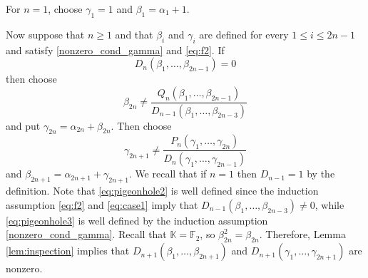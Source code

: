 \documentclass[a4paper,12pt]{article}
\def\bbf{\mathbb{F}}
\def\fq{\bbk}
\def\bbk{\mathbb{K}}
\newcommand{\HankelPolynomial}{D}
\newcommand {\ignore}[1]  {}
\begin{document}
For $n=1$, choose $\gamma_1=1$ and $\beta_1=\alpha_1+1$. 
\ignore{For $n=2$, if $\beta_1=0$ then choose $\beta_2=1$ and $\gamma_2=\alpha_2+1$, and then choose $\beta_3=\alpha_2+\alpha_3$ and $\gamma_3=\alpha_2$. Otherwise, if $\beta_1=1$ then choose $\beta_2$ arbitrary and $\gamma_2=\alpha_2+\beta_2$, and then choose $\beta_3=\gamma_2$ and $\gamma_3=\gamma_2+1$. It is easy to verify that \eqref{sum_cond}, \eqref{nonzero_cond_gamma} and \eqref{eq:f2} hold for $n=2$.}
Now suppose that $n\geq 1$ and that $\beta_i$ and $\gamma_i$ are defined for every $1\le i\le 2n-1$ and satisfy \eqref{nonzero_cond_gamma} and \eqref{eq:f2}. If 
\begin{equation}\label{eq:case1}
    \HankelPolynomial_n(\beta_1,\ldots,\beta_{2n-1})=0
\end{equation}
then choose 
\begin{equation}\label{eq:pigeonhole2}
\beta_{2n} \neq \frac{Q_n(\beta_1,\ldots,\beta_{2n-1})}{\HankelPolynomial_{n-1}(\beta_1,\ldots,\beta_{2n-3})}
\end{equation}
and put $\gamma_{2n}=\alpha_{2n}+\beta_{2n}$. Then choose 
\begin{equation}\label{eq:pigeonhole3}
\gamma_{2n+1} \neq \frac{P_n(\gamma_1,\ldots,\gamma_{2n})}{\HankelPolynomial_{n}(\gamma_1,\ldots,\gamma_{2n-1})}
\end{equation}
and $\beta_{2n+1} = \alpha_{2n+1}+\gamma_{2n+1}$. We recall that if $n=1$ then $D_{n-1}=1$ by the definition. Note that \eqref{eq:pigeonhole2} is well defined since the induction assumption \eqref{eq:f2} and \eqref{eq:case1} imply that $\HankelPolynomial_{n-1}(\beta_1,\ldots,\beta_{2n-3})\neq0$, while \eqref{eq:pigeonhole3} is well defined by the induction assumption \eqref{nonzero_cond_gamma}. Recall that $\fq=\bbf_2$, so $\beta_{2n}^2=\beta_{2n}$. Therefore, Lemma \ref{lem:inspection} implies that $\HankelPolynomial_{n+1}(\beta_1,\ldots,\beta_{2n+1})$ and $\HankelPolynomial_{n+1}(\gamma_1,\ldots,\gamma_{2n+1})$ are nonzero.
\end{document}
